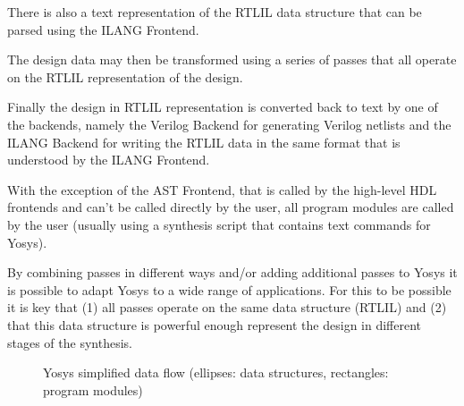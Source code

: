 There is also a text representation of the RTLIL data structure that can be
parsed using the ILANG Frontend.

The design data may then be transformed using a series of passes that all
operate on the RTLIL representation of the design.

Finally the design in RTLIL representation is converted back to text by one
of the backends, namely the Verilog Backend for generating Verilog netlists
and the ILANG Backend for writing the RTLIL data in the same format that is
understood by the ILANG Frontend.

With the exception of the AST Frontend, that is called by the high-level HDL
frontends and can't be called directly by the user, all program modules are
called by the user (usually using a synthesis script that contains text
commands for Yosys).

By combining passes in different ways and/or adding additional passes to Yosys
it is possible to adapt Yosys to a wide range of applications. For this to be
possible it is key that (1) all passes operate on the same data structure
(RTLIL) and (2) that this data structure is powerful enough represent the design
in different stages of the synthesis.

\begin{figure}[t]
	\hfil
	\caption{Yosys simplified data flow (ellipses: data structures, rectangles: program modules)}
	\label{fig:Overview_flow}
\end{figure}

